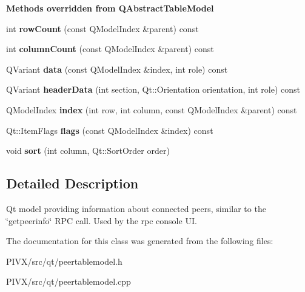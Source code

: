 \begin{Indent}\textbf{ Methods overridden from Q\+Abstract\+Table\+Model}\par
\begin{DoxyCompactItemize}
\item 
\mbox{\label{class_peer_table_model_a893cd78a1bfc89c71a1746d3c3e70e95}} 
int {\bfseries row\+Count} (const Q\+Model\+Index \&parent) const
\item 
\mbox{\label{class_peer_table_model_aec5793e7f02694bd35b05ea1200c4b46}} 
int {\bfseries column\+Count} (const Q\+Model\+Index \&parent) const
\item 
\mbox{\label{class_peer_table_model_a7229a1e75b1ecab25add4098b6bb9d27}} 
Q\+Variant {\bfseries data} (const Q\+Model\+Index \&index, int role) const
\item 
\mbox{\label{class_peer_table_model_ab2db3038337ab51cf8655a4d9f0546d2}} 
Q\+Variant {\bfseries header\+Data} (int section, Qt\+::\+Orientation orientation, int role) const
\item 
\mbox{\label{class_peer_table_model_a11faadd62beac5b9dec146045e8ecbbb}} 
Q\+Model\+Index {\bfseries index} (int row, int column, const Q\+Model\+Index \&parent) const
\item 
\mbox{\label{class_peer_table_model_ad0e101ec541cde4a163d490b58c5442a}} 
Qt\+::\+Item\+Flags {\bfseries flags} (const Q\+Model\+Index \&index) const
\item 
\mbox{\label{class_peer_table_model_ac2211cda0ce659ac4c324c6ff24e1e5f}} 
void {\bfseries sort} (int column, Qt\+::\+Sort\+Order order)
\end{DoxyCompactItemize}
\end{Indent}


\subsection{Detailed Description}
Qt model providing information about connected peers, similar to the \char`\"{}getpeerinfo\char`\"{} R\+PC call. Used by the rpc console UI. 

The documentation for this class was generated from the following files\+:\begin{DoxyCompactItemize}
\item 
P\+I\+V\+X/src/qt/peertablemodel.\+h\item 
P\+I\+V\+X/src/qt/peertablemodel.\+cpp\end{DoxyCompactItemize}
